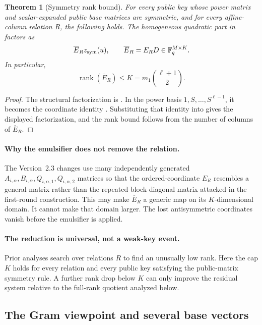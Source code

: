 \documentclass[11pt]{article}
\newtheorem{theorem}{Theorem}
\newcommand{\F}{\mathbb F}
\newcommand{\rank}{\operatorname{rank}}
\begin{document}
\begin{theorem}[Symmetry rank bound]\label{thm:rankbound}
For every public key whose power matrix and scalar-expanded public base matrices are symmetric, and for every affine-column relation $R$, the following holds.  The homogeneous quadratic part in  factors as
\[
 \overline E_R z_{\rm sym}(u),
 \qquad \overline E_R=E_RD\in\F_q^{M\times K}.
\]
In particular,
\[
 \rank(\overline E_R)\le K=m_1\binom{\ell+1}{2}.
\]
\end{theorem}

\begin{proof}
The structural factorization is .  In the power
basis $1,S,\ldots,S^{\ell-1}$, it becomes the coordinate identity
.  Substituting that identity into 
gives the displayed factorization, and the rank bound follows from the number
of columns of $\overline E_R$.
\end{proof}

\paragraph{Why the emulsifier does not remove the relation.}
The Version~2.3 changes use many independently generated $A_{i,\alpha},B_{i,\alpha},Q_{i,\alpha,1},Q_{i,\alpha,2}$ matrices so that the ordered-coordinate $E_R$ resembles a general matrix rather than the repeated block-diagonal matrix attacked in the first-round construction.  This may make $\overline E_R$ a generic map on its $K$-dimensional domain.  It cannot make that domain larger.  The lost antisymmetric coordinates vanish before the emulsifier is applied.

\paragraph{The reduction is universal, not a weak-key event.}
Prior analyses search over relations $R$ to find an unusually low rank.  Here the cap $K$ holds for every relation and every public key satisfying the public-matrix symmetry rule.  A further rank drop below $K$ can only improve the residual system relative to the full-rank quotient analyzed below.

\subsection{The Gram viewpoint and several base vectors}\label{sec:gram}
\end{document}
